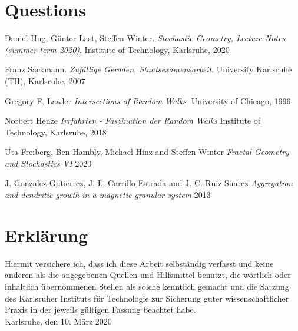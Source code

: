 \documentclass[12pt,a4paper]{scrartcl}
\numberwithin{equation}{subsection}
\newcommand{\1}{\mathbbm{1}}
\numberwithin{equation}{section}
\theoremstyle{definition}
\begin{document}
\newpage
\section{Questions}

\newpage

\begin{thebibliography}{biblio}
\thispagestyle{empty}

Daniel Hug, Günter Last, Steffen Winter.
\emph{Stochastic Geometry, 	Lecture Notes (summer term 2020)}.
Institute of Technology, Karlsruhe, 2020

Franz Sackmann. 
\emph{Zufällige Geraden, Staatsexamensarbeit}.
University Karlsruhe (TH), Karlsruhe, 2007

Gregory F. Lawler
\emph{Intersections of Random Walks}.
University of Chicago, 1996

Norbert Henze
\emph{Irrfahrten - Faszination der Random Walks}
Institute of Technology, Karlsruhe, 2018

Uta Freiberg, Ben Hambly, Michael Hinz and Steffen Winter
\emph{Fractal Geometry and Stochastics VI}
2020

J. Gonzalez-Gutierrez, J. L. Carrillo-Estrada and J. C. Ruiz-Suarez
\emph{Aggregation and dendritic growth in a magnetic granular system}
2013



\end{thebibliography}

\newpage
  
\thispagestyle{empty}

\vspace*{8cm}


\section*{Erklärung}

Hiermit versichere ich, dass ich diese Arbeit selbständig verfasst und keine anderen als die angegebenen Quellen und Hilfsmittel benutzt, die wörtlich oder inhaltlich übernommenen Stellen als solche kenntlich gemacht und die Satzung des Karlsruher Instituts für Technologie zur Sicherung guter wissenschaftlicher Praxis in der jeweils gültigen Fassung beachtet habe. \\[2ex] 

\noindent
Karlsruhe, den 10. März 2020\\[5ex] 
\end{document}
